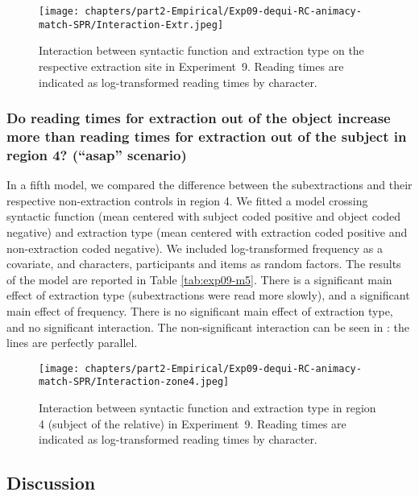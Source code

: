 

\begin{figure}
    \centering
    \texttt{[image: chapters/part2-Empirical/Exp09-dequi-RC-animacy-match-SPR/Interaction-Extr.jpeg]}
    \caption{Interaction between syntactic function and extraction type on the respective extraction site in Experiment~9. Reading times are indicated as log-transformed reading times by character.}
    \label{fig:exp09-interaction}
\end{figure}

\subsubsection{Do reading times for extraction out of the object increase more than reading times for extraction out of the subject in region 4? (``asap'' scenario)}

In a fifth model, we compared the difference between the subextractions and their respective non-extraction controls in region 4. We fitted a model crossing syntactic function (mean centered with subject coded positive and object coded negative) and extraction type (mean centered with extraction coded positive and non-extraction coded negative). We included log-transformed frequency as a covariate, and characters, participants and items as random factors. The results of the model are reported in Table \ref{tab:exp09-m5}. 
There is a significant main effect of extraction type (subextractions were read more slowly), and a significant main effect of frequency. There is no significant main effect of extraction type, and no significant interaction. The non-significant interaction can be seen in : the lines are perfectly parallel.



\begin{figure}
    \centering
    \texttt{[image: chapters/part2-Empirical/Exp09-dequi-RC-animacy-match-SPR/Interaction-zone4.jpeg]}
    \caption{Interaction between syntactic function and extraction type in region 4 (subject of the relative) in Experiment~9. Reading times are indicated as log-transformed reading times by character.}
    \label{fig:exp09-interaction-4}
\end{figure}

\subsection{Discussion}

